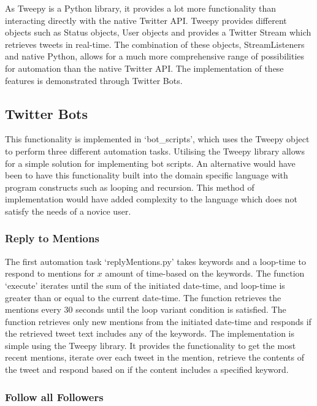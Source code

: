 As Tweepy is a Python library, it provides a lot more functionality than interacting directly with the native Twitter API. Tweepy provides different objects such as Status objects, User objects and provides a Twitter Stream which retrieves tweets in real-time. The combination of these objects, StreamListeners and native Python, allows for a much more comprehensive range of possibilities for automation than the native Twitter API. The implementation of these features is demonstrated through Twitter Bots.

\subsection{Twitter Bots}

 This functionality is implemented in `bot\_scripts', which uses the Tweepy object to perform three different automation tasks. Utilising the Tweepy library allows for a simple solution for implementing bot scripts. An alternative would have been to have this functionality built into the domain specific language with program constructs such as looping and recursion. This method of implementation would have added complexity to the language which does not satisfy the needs of a novice user.
 
 \subsubsection{Reply to Mentions}
 
The first automation task `replyMentions.py' takes keywords and a loop-time to respond to mentions for $x$ amount of time-based on the keywords. The function `execute' iterates until the sum of the initiated date-time, and loop-time is greater than or equal to the current date-time. The function retrieves the mentions every 30 seconds until the loop variant condition is satisfied. The function retrieves only new mentions from the initiated date-time and responds if the retrieved tweet text includes any of the keywords. The implementation is simple using the Tweepy library. It provides the functionality to get the most recent mentions, iterate over each tweet in the mention, retrieve the contents of the tweet and respond based on if the content includes a specified keyword.
 
 \subsubsection{Follow all Followers}
 
